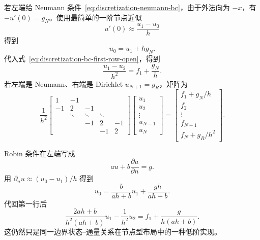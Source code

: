 若左端给 Neumann 条件~\eqref{eq:discretization-neumann-bc}，由于外法向为 $-x$，有 $-u'(0)=g_N$。使用最简单的一阶节点近似
\begin{equation}
u'(0)\approx\frac{u_1-u_0}{h}
\end{equation}
得到
\begin{equation}
\boxed{
u_0=u_1+h g_N.}
\label{eq:discretization-neumann-eliminate-uzero}
\end{equation}
代入式~\eqref{eq:discretization-bc-first-row-open}，得到
\begin{equation}
\boxed{
\frac{u_1-u_2}{h^2}
=f_1+\frac{g_N}{h}.
}
\label{eq:discretization-neumann-first-row}
\end{equation}
若左端是 Neumann、右端是 Dirichlet $u_{N+1}=g_R$，矩阵为
\begin{equation}
\frac1{h^2}
\begin{bmatrix}
1&-1&&&\\
-1&2&-1&&\\
&\ddots&\ddots&\ddots&\\
&&-1&2&-1\\
&&&-1&2
\end{bmatrix}
\begin{bmatrix}
u_1\\u_2\\\vdots\\u_{N-1}\\u_N
\end{bmatrix}
=
\begin{bmatrix}
f_1+g_N/h\\f_2\\\vdots\\f_{N-1}\\f_N+g_R/h^2
\end{bmatrix}.
\label{eq:discretization-mixed-neumann-dirichlet-matrix}
\end{equation}

Robin 条件在左端写成
\begin{equation}
a u+b\frac{\partial u}{\partial n}=g.
\end{equation}
用 $\partial_nu\approx(u_0-u_1)/h$ 得到
\begin{equation}
\boxed{
u_0=\frac{b}{ah+b}u_1+\frac{gh}{ah+b}.}
\label{eq:discretization-robin-boundary-value}
\end{equation}
代回第一行后
\begin{equation}
\boxed{
\frac{2ah+b}{h^2(ah+b)}u_1
-\frac1{h^2}u_2
=f_1+\frac{g}{h(ah+b)}.
}
\label{eq:discretization-robin-matrix-row}
\end{equation}
这仍然只是同一边界状态--通量关系在节点型布局中的一种低阶实现。

